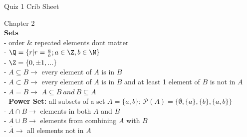 \documentclass[12pt, letterpaper]{article}
\begin{document}
\begin{center}
  Quiz 1 Crib Sheet
\end{center}

\begin{multicols}{2}

Chapter 2\\
\textbf{Sets}\\
- order \& repeated elements dont matter\\
- $\Q = \{ r | r = \frac{a}{b}; a \in \Z, b \in \N \}$ \\
- $\Z = \{ 0, \pm 1,... \}$\\
- $A \subseteq B \rightarrow$ every element of $A$ is in $B$ \\
- $A \subset B \rightarrow$ every element of $A$ is in $B$ and at least 1 element of $B$ is not in $A$ \\
- $A = B \rightarrow$ $A \subseteq B \ and \ B \subseteq A$\\
- \textbf{Power Set:} all subsets of a set $A = \{ a,b \}$;
$\mathcal{P}(A) = \{\emptyset, \{ a \}, \{ b \}, \{ a, b \} \}$\\
- $A \cap B \rightarrow$ elements in both $A$ and $B$ \\
- $A \cup B \rightarrow$ elements from combining $A$ with $B$ \\
- $\overline{A} \rightarrow$ all elements not in $A$ \\
\end{multicols}
\end{document}
